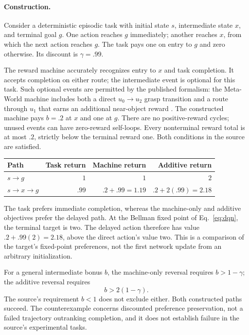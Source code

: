 \documentclass[11pt]{article}
\begin{document}
\paragraph{Construction.}
Consider a deterministic episodic task with initial state $s$, intermediate state $x$, and terminal goal $g$. One action reaches $g$ immediately; another reaches $x$, from which the next action reaches $g$. The task pays one on entry to $g$ and zero otherwise. Its discount is $\gamma=.99$.

The reward machine accurately recognizes entry to $x$ and task completion. It accepts completion on either route; the intermediate event is optional for this task. Such optional events are permitted by the published formalism: the Meta-World machine includes both a direct $u_0\to u_2$ grasp transition and a route through $u_1$ that earns an additional near-object reward \citep[Appendix A.9, PDF p.~32]{Castanyer2026ARMFM}. The constructed machine pays $b=.2$ at $x$ and one at $g$. There are no positive-reward cycles; unused events can have zero-reward self-loops. Every nonterminal reward total is at most $.2$, strictly below the terminal reward one. Both conditions in the source are satisfied.

\begin{center}
\renewcommand{\arraystretch}{1.15}
\begin{tabular}{lrrr}
\toprule
Path & Task return & Machine return & Additive return\\
\midrule
$s\to g$ & $1$ & $1$ & $2$\\
$s\to x\to g$ & $.99$ & $.2+.99=1.19$ & $.2+2(.99)=2.18$\\
\bottomrule
\end{tabular}
\end{center}

The task prefers immediate completion, whereas the machine-only and additive objectives prefer the delayed path. At the Bellman fixed point of Eq.~\eqref{eq:dqn}, the terminal target is two. The delayed action therefore has value $.2+.99(2)=2.18$, above the direct action's value two. This is a comparison of the target's fixed-point preferences, not the first network update from an arbitrary initialization.

For a general intermediate bonus $b$, the machine-only reversal requires $b>1-\gamma$; the additive reversal requires
\begin{equation}
b>2(1-\gamma).
\label{eq:rmthreshold}
\end{equation}
The source's requirement $b<1$ does not exclude either. Both constructed paths succeed. The counterexample concerns discounted preference preservation, not a failed trajectory outranking completion, and it does not establish failure in the source's experimental tasks.
\end{document}
